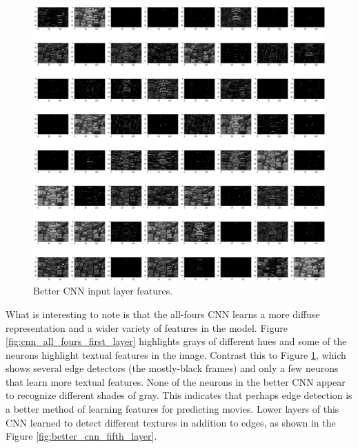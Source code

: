 \documentclass[12pt, oneside]{article}   	%
\begin{document}
\begin{figure}%
\includegraphics[width=\textwidth]{better_cnn_first_layer}
\caption{\label{fig:better_cnn_first_layer}Better CNN input layer features.}
\end{figure}

What is interesting to note is that the all-fours CNN learns a more diffuse representation and a wider variety of features in the model. Figure \ref{fig:cnn_all_fours_first_layer} highlights grays of different hues and some of the neurons highlight textual features in the image. Contrast this to Figure \ref{fig:better_cnn_first_layer}, which shows several edge detectors (the mostly-black frames) and only a few neurons that learn more textual features. None of the neurons in the better CNN appear to recognize different shades of gray. This indicates that perhaps edge detection is a better method of learning features for predicting movies. Lower layers of this CNN learned to detect different textures in addition to edges, as shown in the Figure \ref{fig:better_cnn_fifth_layer}.
\end{document}
